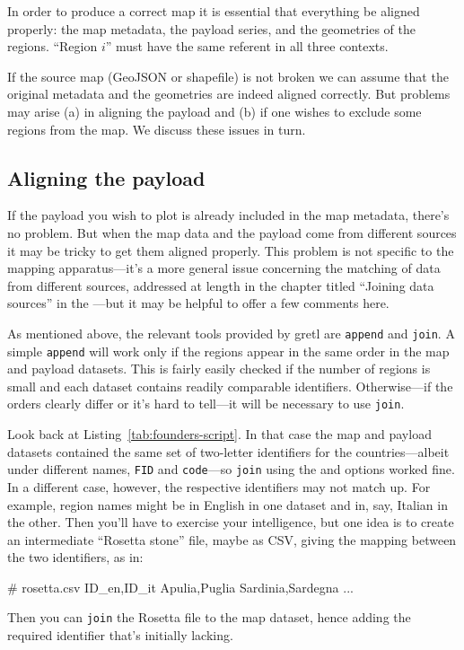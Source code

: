 \documentclass{article}
\begin{document}
In order to produce a correct map it is essential that everything be
aligned properly: the map metadata, the payload series, and the
geometries of the regions. ``Region $i$'' must have the same referent
in all three contexts.

If the source map (GeoJSON or shapefile) is not broken we can assume
that the original metadata and the geometries are indeed aligned
correctly. But problems may arise (a) in aligning the payload and (b)
if one wishes to exclude some regions from the map. We discuss these
issues in turn.

\subsection{Aligning the payload}

If the payload you wish to plot is already included in the map
metadata, there's no problem. But when the map data and the payload
come from different sources it may be tricky to get them aligned
properly. This problem is not specific to the mapping apparatus---it's
a more general issue concerning the matching of data from different
sources, addressed at length in the chapter titled ``Joining data
sources'' in the \GUG{}---but it may be helpful to offer a few
comments here.

As mentioned above, the relevant tools provided by gretl are
\texttt{append} and \texttt{join}. A simple \texttt{append} will work
only if the regions appear in the same order in the map and payload
datasets. This is fairly easily checked if the number of regions is
small and each dataset contains readily comparable
identifiers. Otherwise---if the orders clearly differ or it's hard to
tell---it will be necessary to use \texttt{join}.

Look back at Listing~\ref{tab:founders-script}. In that case the map
and payload datasets contained the same set of two-letter identifiers
for the countries---albeit under different names, \texttt{FID} and
\texttt{code}---so \texttt{join} using the  and
 options worked fine. In a different case, however, the
respective identifiers may not match up. For example, region names
might be in English in one dataset and in, say, Italian in the
other. Then you'll have to exercise your intelligence, but one idea is
to create an intermediate ``Rosetta stone'' file, maybe as CSV, giving
the mapping between the two identifiers, as in:
\begin{code}
# rosetta.csv
ID_en,ID_it
Apulia,Puglia
Sardinia,Sardegna
...
\end{code}
Then you can \texttt{join} the Rosetta file to the map dataset, hence
adding the required identifier that's initially lacking.
\end{document}
